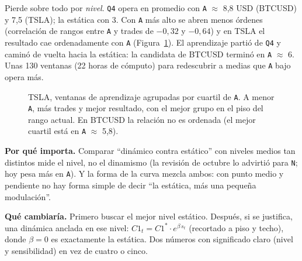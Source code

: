 \documentclass[11pt,a4paper]{article}
\newcommand{\code}[1]{\texttt{\small #1}}
\begin{document}
Pierde sobre todo por \emph{nivel}. \code{Q4} opera en promedio con \code{A} $\approx$ 8,8 USD (BTCUSD) y
7,5 (TSLA); la estática con 3. Con \code{A} más alto se abren menos órdenes (correlación de rangos entre
\code{A} y trades de $-0{,}32$ y $-0{,}64$) y en TSLA el resultado cae ordenadamente con \code{A}
(Figura~\ref{fig:A}). El aprendizaje partió de \code{Q4} y caminó de vuelta hacia la estática: la
candidata de BTCUSD terminó en \code{A} $\approx$ 6. Unas 130 ventanas (22 horas de cómputo) para
redescubrir a medias que \code{A} bajo opera más.

\begin{figure}[h]
\centering
{}
\caption{TSLA, ventanas de aprendizaje agrupadas por cuartil de \code{A}. A menor \code{A}, más trades y
mejor resultado, con el mejor grupo en el piso del rango actual. En BTCUSD la relación no es ordenada (el
mejor cuartil está en \code{A} $\approx$ 5,8).}
\label{fig:A}
\end{figure}

\textbf{Por qué importa.} Comparar ``dinámico contra estático'' con niveles medios tan distintos mide el
nivel, no el dinamismo (la revisión de octubre lo advirtió para \code{N}; hoy pesa más en \code{A}). Y la
forma de la curva mezcla ambos: con punto medio y pendiente no hay forma simple de decir ``la estática,
más una pequeña modulación''.

\textbf{Qué cambiaría.} Primero buscar el mejor nivel estático. Después, si se justifica, una dinámica
anclada en ese nivel: $C1_t = C1^{*} \cdot e^{\beta\, s_t}$ (recortado a piso y techo), donde $\beta = 0$ es
exactamente la estática. Dos números con significado claro (nivel y sensibilidad) en vez de cuatro o cinco.
\end{document}

